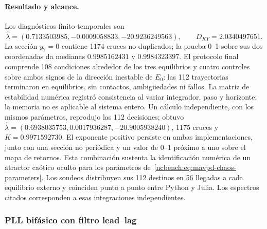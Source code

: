\paragraph{Resultado y alcance.}
Los diagnósticos finito-temporales son
\begin{equation}
 \widehat\lambda=(0.7133503985,-0.0009058833,-20.9236249563),
 \qquad D_{KY}=2.0340497651.
 \label{ncbench:eq:mavpd-chaos-results}
\end{equation}
La sección \(y_2=0\) contiene 1174 cruces no duplicados; la prueba 0--1
sobre sus dos coordenadas da medianas \(0.9985162431\) y \(0.9984323397\).
El protocolo final comprende 108 condiciones alrededor de los tres
equilibrios y cuatro controles sobre ambos signos de la dirección inestable de
\(E_0\): las 112 trayectorias terminaron en equilibrios, sin contactos,
ambigüedades ni fallos. La matriz de estabilidad numérica registró consistencia
al variar integrador, paso y horizonte; la memoria no es aplicable al sistema
entero. Un cálculo independiente, con los mismos parámetros, reprodujo las
112 decisiones; obtuvo
\(\widehat\lambda=(0.6938035753,0.0017936287,-20.9005938240)\), 1175 cruces y
\(K=0.9971592730\). El exponente positivo persiste en ambas
implementaciones, junto con una sección no periódica y un valor de 0--1
próximo a uno sobre el mapa de retornos. Esta combinación sustenta la
identificación numérica de un atractor caótico oculto para los parámetros
de~\eqref{ncbench:eq:mavpd-chaos-parameters}. Los sondeos distribuyen sus
112 destinos en 56 llegadas a cada equilibrio externo y coinciden punto a
punto entre Python y Julia. Los espectros citados corresponden a esas
integraciones independientes.

\subsubsection{PLL bifásico con filtro lead--lag}

